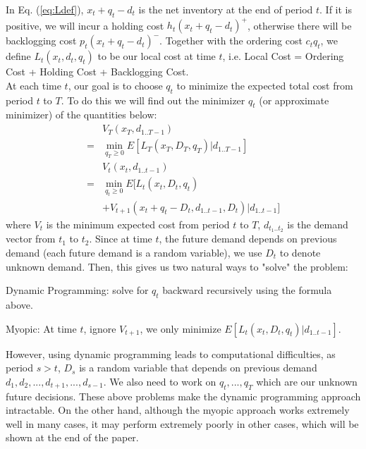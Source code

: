 \documentclass[twoside]{article}
\begin{document}
\begin{multicols}{2}
    In Eq. (\ref{eq:Ldef}), $x_t + q_t - d_t$ is the net inventory at the end of period $t$. If it is positive, we will incur a holding cost $h_t(x_t + q_t - d_t)^{+}$, otherwise there will be backlogging cost $p_t(x_t + q_t - d_t)^{-}$. Together with the ordering cost $c_tq_t$, we define $L_t(x_t,d_t,q_t)$ to be our local cost at time $t$, i.e. Local Cost = Ordering Cost + Holding Cost + Backlogging Cost.\\
    At each time $t$, our goal is to choose $q_t$ to minimize the expected total cost from period $t$ to $T$. To do this we will find out the minimizer $q_t$ (or approximate minimizer) of the quantities below:
    \begin{equation}\label{eq:Vt}
    \begin{array}{rl}
    & V_T(x_T,d_{1..T-1}) \\
    = & \min_{q_T \geq 0} E[L_T(x_T,D_T,q_T) | d_{1..T-1}]\\
    &V_t(x_t,d_{1..t-1}) \\
    = & \min_{q_t \geq 0} E[L_t(x_t,D_t,q_t)\\
    & +V_{t+1}(x_t + q_t - D_t, d_{1..t-1},D_t)|d_{1..t-1}]
    \end{array}
    \end{equation}
    where $V_t$ is the minimum expected cost from period $t$ to $T$, $d_{t_1..t_2}$ is the demand vector from $t_1$ to $t_2$. Since at time $t$, the future demand depends on previous demand (each future demand is a random variable), we use $D_t$ to denote unknown demand. Then, this gives us two natural ways to "solve" the problem:
    \begin{compactitem}
      \item
        Dynamic Programming: solve for $q_t$ backward recursively using the formula above.
      \item
        Myopic: At time $t$, ignore $V_{t+1}$, we only minimize $E[L_t(x_t,D_t,q_t)|d_{1..t-1}]$.
    \end{compactitem}
     However, using dynamic programming leads to computational difficulties, as period $s>t$, $D_s$ is a random variable that depends on previous demand $d_1, d_2,...,d_{t+1},...,d_{s-1}$. We also need to work on $q_t,...,q_T$ which are our unknown future decisions. These above problems make the dynamic programming approach intractable. On the other hand, although the myopic approach works extremely well in many cases\cite{CLAcha1}, it may perform extremely poorly in other cases, which will be shown at the end of the paper.\\


\end{multicols}
\end{document}
